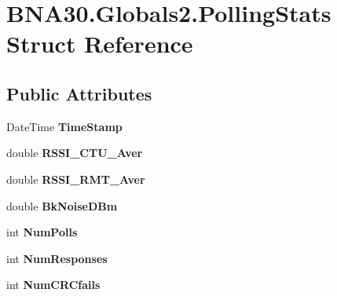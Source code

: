 \hypertarget{struct_b_n_a30_1_1_globals2_1_1_polling_stats}{}\section{B\+N\+A30.\+Globals2.\+Polling\+Stats Struct Reference}
\label{struct_b_n_a30_1_1_globals2_1_1_polling_stats}
\subsection*{Public Attributes}
\begin{DoxyCompactItemize}
\item 
\mbox{\label{struct_b_n_a30_1_1_globals2_1_1_polling_stats_a1728c7936e77710e77acf6fc8223f0f4}} 
Date\+Time {\bfseries Time\+Stamp}
\item 
\mbox{\label{struct_b_n_a30_1_1_globals2_1_1_polling_stats_a4d3bd1ec3ea8851f0a8e36aead1e8543}} 
double {\bfseries R\+S\+S\+I\+\_\+\+C\+T\+U\+\_\+\+Aver}
\item 
\mbox{\label{struct_b_n_a30_1_1_globals2_1_1_polling_stats_a13c9c00ef17ecbc3073599e572b0e76f}} 
double {\bfseries R\+S\+S\+I\+\_\+\+R\+M\+T\+\_\+\+Aver}
\item 
\mbox{\label{struct_b_n_a30_1_1_globals2_1_1_polling_stats_a8d88fee45729df17aa1c1207ef072f26}} 
double {\bfseries Bk\+Noise\+D\+Bm}
\item 
\mbox{\label{struct_b_n_a30_1_1_globals2_1_1_polling_stats_a9bff027ff048cf323699892525ea10c0}} 
int {\bfseries Num\+Polls}
\item 
\mbox{\label{struct_b_n_a30_1_1_globals2_1_1_polling_stats_a6f38db7d7f2eefbfdc2601d0f9b65b07}} 
int {\bfseries Num\+Responses}
\item 
\mbox{\label{struct_b_n_a30_1_1_globals2_1_1_polling_stats_a0da55a1af0c600f29057eeee4ef9e66a}} 
int {\bfseries Num\+C\+R\+Cfails}
\item 

\end{DoxyCompactItemize}
